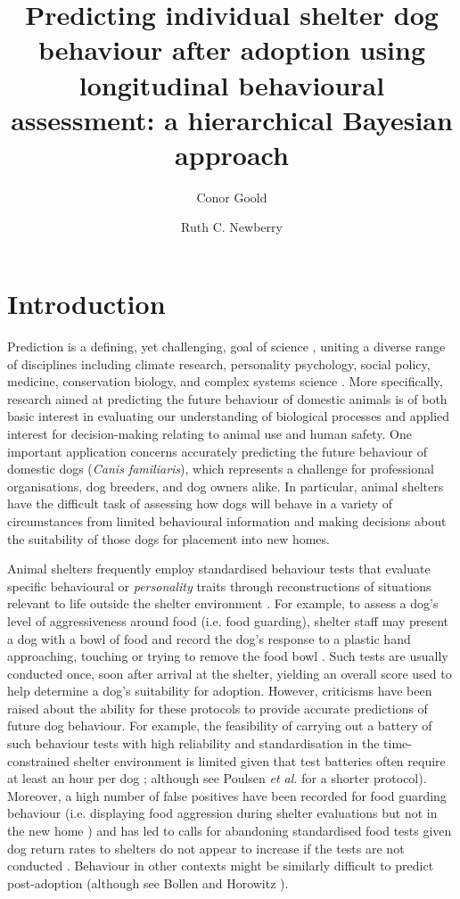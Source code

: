 \documentclass[fleqn,10pt]{wlscirep}
\title{Predicting individual shelter dog behaviour after adoption using longitudinal behavioural assessment: a hierarchical Bayesian approach}
\author[1]{Conor Goold}
\author[2*]{Ruth C. Newberry}
\affil[1]{School of Biology, Faculty of Biological Sciences, University of Leeds, Leeds, LS2 9JT, UK}
\affil[2]{Department of Animal and Aquacultural Sciences, Faculty of Biosciences, Norwegian University of Life Sciences, \r{A}s, 1400, Norway}
\affil[*]{ruth.newberry@nmbu.no}
\begin{document}
\flushbottom
\maketitle
\thispagestyle{empty}

\section*{Introduction}
Prediction is a defining, yet challenging, goal of science \cite{hofstadter1951}, uniting a diverse range of disciplines including climate research, personality psychology, social policy, medicine, conservation biology, and complex systems science \cite{sarewitz1999}. More specifically, research aimed at predicting the future behaviour of domestic animals is of both basic interest in evaluating our understanding of biological processes and applied interest for decision-making relating to animal use and human safety. One important application concerns accurately predicting the future behaviour of domestic dogs (\textit{Canis familiaris}), which represents a challenge for professional organisations, dog breeders, and dog owners alike. In particular, animal shelters have the difficult task of assessing how dogs will behave in a variety of circumstances from limited behavioural information and making decisions about the suitability of those dogs for placement into new homes.

Animal shelters frequently employ standardised behaviour tests that evaluate specific behavioural or \textit{personality} traits through reconstructions of situations relevant to life outside the shelter environment \cite{vanderborg1991,marston2003,mornement2010,taylor2006,rayment2015,clay2020behaviour}. For example, to assess a dog's level of aggressiveness around food (i.e. food guarding), shelter staff may present a dog with a bowl of food and record the dog's response to a plastic hand approaching, touching or trying to remove the food bowl \cite{mohangibbons2012,mohangibbons2018,marder2013}. Such tests are usually conducted once, soon after arrival at the shelter, yielding an overall score used to help determine a dog's suitability for adoption. However, criticisms have been raised about the ability for these protocols to provide accurate predictions of future dog behaviour. For example, the feasibility of carrying out a battery of such behaviour tests with high reliability and standardisation in the time-constrained shelter environment is limited given that test batteries often require at least an hour per dog \cite{vanderborg1991,mornement2009}; although see Poulsen \textit{et al.} \cite{poulsen2010} for a shorter protocol). Moreover, a high number of false positives have been recorded for food guarding behaviour (i.e. displaying food aggression during shelter evaluations but not in the new home \cite{mohangibbons2012,marder2013}) and has led to calls for abandoning standardised food tests given dog return rates to shelters do not appear to increase if the tests are not conducted \cite{mohangibbons2018}. Behaviour in other contexts might be similarly difficult to predict post-adoption \cite{christensen2007,mornement2015} (although see Bollen and Horowitz \cite{bollen2008}).
\end{document}
